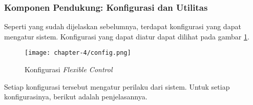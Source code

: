\subsubsection{Komponen Pendukung: Konfigurasi dan Utilitas}

Seperti yang sudah dijelaskan sebelumnya, terdapat konfigurasi yang dapat mengatur sistem. Konfigurasi yang dapat diatur dapat dilihat pada gambar \ref{fig:config-spek}.

\begin{figure}[h]
    \centering
    \texttt{[image: chapter-4/config.png]}
    \caption{Konfigurasi \textit{Flexible Control}}
    \label{fig:config-spek}
\end{figure}

Setiap konfigurasi tersebut mengatur perilaku dari sistem. Untuk setiap konfigurasinya, berikut adalah penjelasannya.

